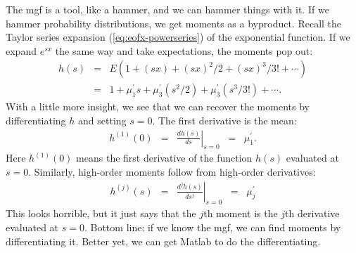 The mgf is a tool, like a hammer, and we can hammer things with it.
If we hammer probability distributions, we get moments as a byproduct.
Recall the Taylor series expansion (\ref{eq:eofx-powerseries}) of the exponential function.
If we expand $e^{sx}$ the same way and take expectations,
the moments pop out:
\begin{eqnarray*}
    h(s) &=& E \left( 1 + (sx) + (sx)^2/2 + (sx)^3/3! + \cdots \right) \\
            &=&  1 + \mu_1^\prime s + \mu_3^\prime (s^2/2)  + \mu_3^\prime (s^3/3!)  + \cdots .
\end{eqnarray*}
With a little more insight, we see that we can recover the moments by differentiating
$h$ and setting $s=0$.
The first derivative is the mean:
\begin{eqnarray*}
    h^{(1)} (0)  &=& \left. \frac{ d h(s)}{d s} \right|_{s=0}
            \;\;=\;\;  \mu_1^\prime .
\end{eqnarray*}
Here $h^{(1)}(0)$ means the first derivative of the function $h(s)$ evaluated at
$s=0$.
Similarly, high-order moments follow from high-order derivatives:
\begin{eqnarray*}
    h^{(j)} (s)  &=& \left. \frac{d^j h(s)}{d s^j} \right|_{s=0}
            \;\;=\;\;  \mu_j^\prime
\end{eqnarray*}
This looks horrible, but it just says that the $j$th moment is the $j$th derivative
evaluated at $s=0$.
Bottom line:  if we know the mgf, we can find moments by differentiating it.
Better yet, we can get Matlab to do the differentiating.

